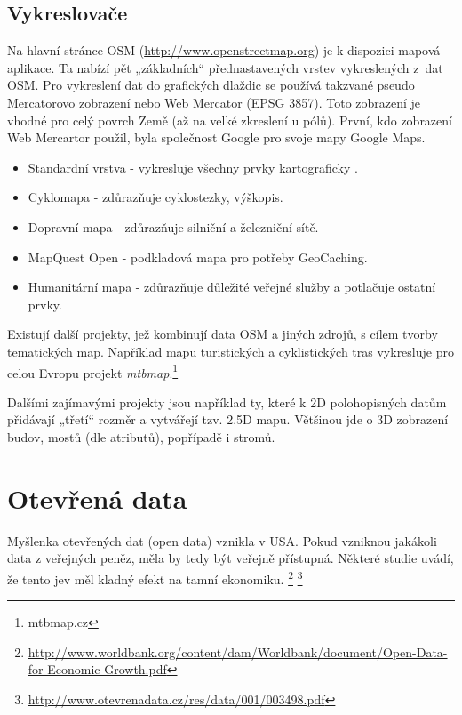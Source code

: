 \subsection{Vykreslovače}
\label{Vykreslovače}
Na hlavní stránce OSM (\url{http://www.openstreetmap.org}) je k dispozici mapová aplikace. Ta nabízí pět
„základních“ přednastavených vrstev vykreslených z~dat OSM.
Pro vykreslení dat do grafických dlaždic se používá takzvané pseudo Mercatorovo
zobrazení nebo Web Mercator (EPSG 3857). Toto zobrazení je vhodné pro celý povrch Země (až na velké zkreslení u pólů). 
První, kdo zobrazení Web Mercartor použil, byla společnost Google pro svoje mapy Google Maps.\cite{WebMercator}

\begin{itemize}
  \item Standardní vrstva - vykresluje všechny prvky kartograficky .
  \item Cyklomapa - zdůrazňuje cyklostezky, výškopis. 
  \item Dopravní mapa - zdůrazňuje silniční a železniční sítě.
  \item MapQuest Open - podkladová mapa pro potřeby GeoCaching.
  \item Humanitární mapa - zdůrazňuje důležité veřejné služby a potlačuje ostatní prvky. 
\end{itemize}

Existují další projekty, jež kombinují data OSM a jiných zdrojů, s cílem tvorby tematických map.
Například mapu turistických a cyklistických tras vykresluje
pro celou Evropu projekt \textit{mtbmap}.\footnote{mtbmap.cz}

Dalšími zajímavými projekty jsou například ty, které k 2D polohopisných datům přidávají „třetí“ rozměr a
vytvářejí tzv. 2.5D mapu. Většinou jde o 3D zobrazení budov, mostů (dle
atributů), popřípadě i stromů.



\section{Otevřená data}
\label{opendata}

Myšlenka otevřených dat (open data) vznikla v USA.
Pokud vzniknou jakákoli data z veřejných peněz, měla by tedy být
veřejně přístupná. Některé studie uvádí, že tento jev měl kladný efekt na tamní ekonomiku.
\footnote{\url{http://www.worldbank.org/content/dam/Worldbank/document/Open-Data-for-Economic-Growth.pdf}}
\footnote{\url{http://www.otevrenadata.cz/res/data/001/003498.pdf}}

